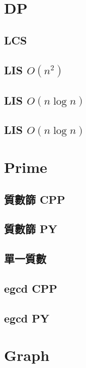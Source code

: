 \section{DP}
    \subsection{LCS}
        
    \subsection{LIS $O(n^2)$}
         
    \subsection{LIS $O(n \log n)$}
        
    \subsection{LIS $O(n \log n)$}
        
\section{Prime}
    \subsection{質數篩 CPP}
        
    \subsection{質數篩 PY}
        
    \subsection{單一質數}
        
    \subsection{egcd CPP}
        
    \subsection{egcd PY}
        

\section{Graph}
